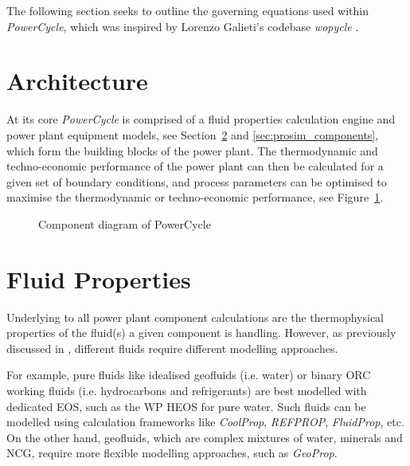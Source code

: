 The following section seeks to outline the governing equations used within \emph{PowerCycle}, which was inspired by Lorenzo Galieti's codebase \emph{wopycle} \cite{Galieti2023}. 

\section{Architecture}
    At its core \emph{PowerCycle} is comprised of a fluid properties calculation engine and power plant equipment models, see Section~\ref{sec:prosim_fluid_props} and \ref{sec:prosim_components}, which form the building blocks of the power plant. The thermodynamic and techno-economic performance of the power plant can then be calculated for a given set of boundary conditions, and process parameters can be optimised to maximise the thermodynamic or techno-economic performance, see Figure~\ref{fig:powercycle}.

    \begin{figure}[H]
        \centering
        \resizebox{16cm}{!}{
                
        }
        \caption{Component diagram of PowerCycle}
        \label{fig:powercycle}
    \end{figure}

\section{Fluid Properties}
    \label{sec:prosim_fluid_props}
    Underlying to all power plant component calculations are the thermophysical properties of the fluid(s) a given component is handling. However, as previously discussed in , different fluids require different modelling approaches. 
    
    For example, pure fluids like idealised geofluids (i.e. water) or binary ORC working fluids (i.e. hydrocarbons and refrigerants) are best modelled with dedicated EOS, such as the \ac{WP} \ac{HEOS} for pure water. Such fluids can be modelled using calculation frameworks like \emph{CoolProp}, \emph{REFPROP}, \emph{FluidProp}, etc.  On the other hand, geofluids, which are complex mixtures of water, minerals and \ac{NCG}, require more flexible modelling approaches, such as \emph{GeoProp}.
    

